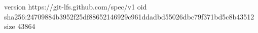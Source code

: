 version https://git-lfs.github.com/spec/v1
oid sha256:24709884b3952f25df88652146929c961ddadbd55026dbc79f371bd5c8b43512
size 43864
